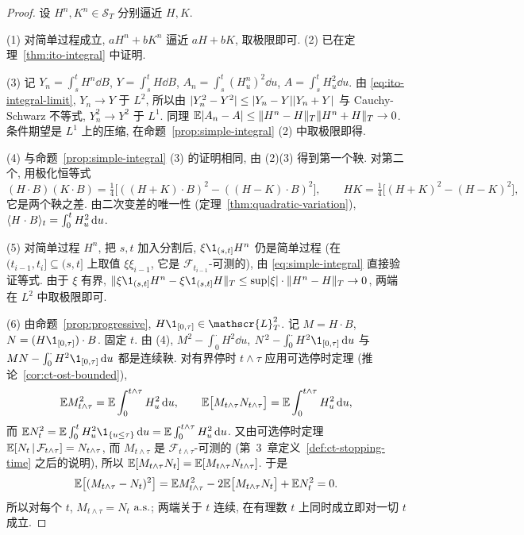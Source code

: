 \begin{proof}
设 $H^n,K^n\in\mathscr{S}_T$ 分别逼近 $H,K$.

(1) 对简单过程成立, $aH^n+bK^n$ 逼近 $aH+bK$, 取极限即可. (2) 已在定理~\ref{thm:ito-integral} 中证明.

(3) 记 $Y_n=\int_s^tH^n\dd B$, $Y=\int_s^tH\dd B$, $A_n=\int_s^t(H^n_u)^2\dd u$, $A=\int_s^tH_u^2\dd u$. 由 \eqref{eq:ito-integral-limit}, $Y_n\to Y$ 于 $L^2$, 所以由 $\lvert Y_n^2-Y^2\rvert\le\lvert Y_n-Y\rvert\lvert Y_n+Y\rvert$ 与 Cauchy-Schwarz 不等式, $Y_n^2\to Y^2$ 于 $L^1$. 同理 $\mathbb{E}\lvert A_n-A\rvert\le\lVert H^n-H\rVert_T\lVert H^n+H\rVert_T\to0$. 条件期望是 $L^1$ 上的压缩, 在命题~\ref{prop:simple-integral} (2) 中取极限即得.

(4) 与命题~\ref{prop:simple-integral} (3) 的证明相同, 由 (2)(3) 得到第一个鞅. 对第二个, 用极化恒等式
\[
(H\cdot B)(K\cdot B)=\tfrac{1}{4}\big[((H+K)\cdot B)^2-((H-K)\cdot B)^2\big],\qquad HK=\tfrac{1}{4}\big[(H+K)^2-(H-K)^2\big],
\]
它是两个鞅之差. 由二次变差的唯一性 (定理~\ref{thm:quadratic-variation}), $\langle H\cdot B\rangle_t=\int_0^tH_u^2\mathop{}\!\mathrm{d} u$.

(5) 对简单过程 $H^n$, 把 $s,t$ 加入分割后, $\xi\1_{(s,t]}H^n$ 仍是简单过程 (在 $(t_{i-1},t_i]\subseteq(s,t]$ 上取值 $\xi\xi_{i-1}$, 它是 $\mathcal{F}_{t_{i-1}}$-可测的), 由 \eqref{eq:simple-integral} 直接验证等式. 由于 $\xi$ 有界, $\norm{\xi\1_{(s,t]}H^n-\xi\1_{(s,t]}H}_T\le\sup\abs{\xi}\cdot\norm{H^n-H}_T\to0$, 两端在 $L^2$ 中取极限即可.

(6) 由命题~\ref{prop:progressive}, $H\1_{[0,\tau]}\in\mathscr{L}^2_T$. 记 $M=H\cdot B$, $N=(H\1_{[0,\tau]})\cdot B$. 固定 $t$. 由 (4), $M^2-\int_0^\cdot H^2\dd u$, $N^2-\int_0^\cdot H^2\1_{[0,\tau]}\dd u$ 与 $MN-\int_0^\cdot H^2\1_{[0,\tau]}\dd u$ 都是连续鞅. 对有界停时 $t\wedge\tau$ 应用可选停时定理 (推论~\ref{cor:ct-ost-bounded}),
\[
\mathbb{E} M_{t\wedge\tau}^2=\mathbb{E}\int_0^{t\wedge\tau}H_u^2\mathop{}\!\mathrm{d} u,\qquad\mathbb{E}\big[M_{t\wedge\tau}N_{t\wedge\tau}\big]=\mathbb{E}\int_0^{t\wedge\tau}H_u^2\mathop{}\!\mathrm{d} u,
\]
而 $\E N_t^2=\E\int_0^tH_u^2\1_{\{u\le\tau\}}\dd u=\E\int_0^{t\wedge\tau}H_u^2\dd u$. 又由可选停时定理 $\mathbb{E}[N_t\,|\,\mathcal{F}_{t\wedge\tau}]=N_{t\wedge\tau}$, 而 $M_{t\wedge\tau}$ 是 $\mathcal{F}_{t\wedge\tau}$-可测的 (第~3~章定义~\ref{def:ct-stopping-time} 之后的说明), 所以 $\mathbb{E}[M_{t\wedge\tau}N_t]=\mathbb{E}[M_{t\wedge\tau}N_{t\wedge\tau}]$. 于是
\[
\mathbb{E}\big[(M_{t\wedge\tau}-N_t)^2\big]=\mathbb{E} M_{t\wedge\tau}^2-2\mathbb{E}\big[M_{t\wedge\tau}N_t\big]+\mathbb{E} N_t^2=0.
\]
所以对每个 $t$, $M_{t\wedge\tau}=N_t$ $\text{a.s.}$; 两端关于 $t$ 连续, 在有理数 $t$ 上同时成立即对一切 $t$ 成立.
\end{proof}

